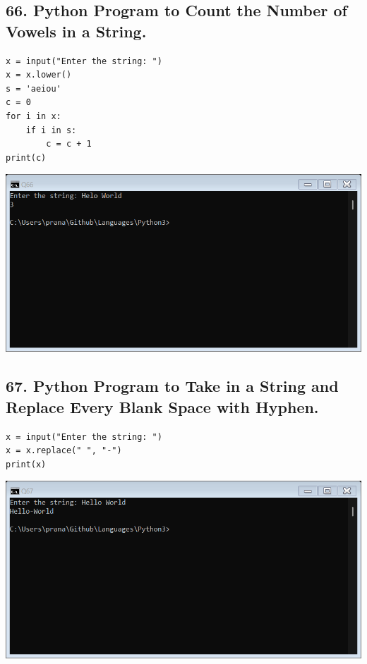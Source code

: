 \documentclass[12pt]{article}
\begin{document}
\subsection*{66. Python Program to Count the Number of Vowels in a String.}
\begin{verbatim}
x = input("Enter the string: ")
x = x.lower()
s = 'aeiou'
c = 0
for i in x:
    if i in s:
        c = c + 1
print(c)
\end{verbatim}
\includegraphics[width=\linewidth]{images/66.png}

\subsection*{67. Python Program to Take in a String and Replace Every Blank Space with Hyphen.}
\begin{verbatim}
x = input("Enter the string: ")
x = x.replace(" ", "-")
print(x)
\end{verbatim}
\includegraphics[width=\linewidth]{images/67.png}
\end{document}
